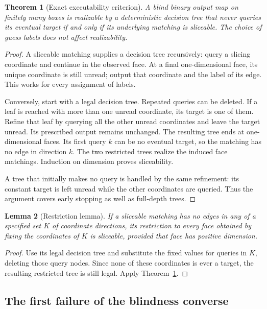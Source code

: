 \documentclass[11pt,letterpaper]{article}
\newtheorem{theorem}{Theorem}[section]
\newtheorem{lemma}[theorem]{Lemma}
\theoremstyle{definition}
\begin{document}
\begin{theorem}[Exact executability criterion]
\label{mbg:thm:slice}
A blind binary output map on finitely many boxes is realizable by a deterministic decision tree that never queries its eventual target if and only if its underlying matching is sliceable. The choice of guess labels does not affect realizability.
\end{theorem}
\begin{proof}
A sliceable matching supplies a decision tree recursively: query a slicing coordinate and continue in the observed face. At a final one-dimensional face, its unique coordinate is still unread; output that coordinate and the label of its edge. This works for every assignment of labels.

Conversely, start with a legal decision tree. Repeated queries can be deleted. If a leaf is reached with more than one unread coordinate, its target is one of them. Refine that leaf by querying all the other unread coordinates and leave the target unread. Its prescribed output remains unchanged. The resulting tree ends at one-dimensional faces. Its first query $k$ can be no eventual target, so the matching has no edge in direction $k$. The two restricted trees realize the induced face matchings. Induction on dimension proves sliceability.

A tree that initially makes no query is handled by the same refinement: its constant target is left unread while the other coordinates are queried. Thus the argument covers early stopping as well as full-depth trees.
\end{proof}

\begin{lemma}[Restriction lemma]
\label{mbg:lem:restriction}
If a sliceable matching has no edges in any of a specified set $K$ of coordinate directions, its restriction to every face obtained by fixing the coordinates of $K$ is sliceable, provided that face has positive dimension.
\end{lemma}
\begin{proof}
Use its legal decision tree and substitute the fixed values for queries in $K$, deleting those query nodes. Since none of these coordinates is ever a target, the resulting restricted tree is still legal. Apply Theorem~\ref{mbg:thm:slice}.
\end{proof}

\subsection{The first failure of the blindness converse}
\end{document}
